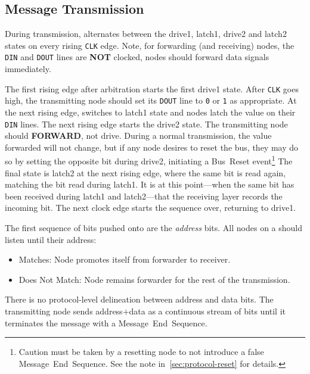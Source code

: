 \subsection{Message Transmission}
\label{sec:protocol-transmission}
During transmission, \bus alternates between the {\sc drive1}, {\sc latch1},
{\sc drive2} and {\sc latch2} states on every rising {\tt CLK} edge. 
Note, for forwarding (and receiving) nodes, the {\tt DIN} and {\tt DOUT} lines 
are {\bf NOT} clocked, nodes should forward data signals immediately.

The first rising edge after arbitration starts the first {\sc drive1} state.
After {\tt CLK} goes high, the transmitting node should set its {\tt DOUT}
line to {\tt 0} or {\tt 1} as appropriate. At the next rising edge, \bus
switches to {\sc latch1} state and nodes latch the value on their {\tt DIN}
lines. The next rising edge starts the {\sc drive2} state. The transmitting
node should \textsc{\textbf{FORWARD}}, not drive. During a normal
transmission, the value forwarded will not change, but if any node desires to
reset the bus, they may do so by setting the opposite bit during {\sc drive2},
initiating a Bus~Reset event\footnote{
  Caution must be taken by a resetting node to not introduce a false
  Message~End~Sequence. See the note in~\ref{sec:protocol-reset} for details.}
The final state is {\sc latch2} at the next rising edge, where the same bit is
read again, matching the bit read during {\sc latch1}.  It is at this
point---when the same bit has been received during {\sc latch1} and {\sc
latch2}---that the receiving layer records the incoming bit. The next clock
edge starts the sequence over, returning to {\sc drive1}.

The first sequence of bits pushed onto \bus are the {\em address} bits. All
nodes on a \bus should listen until their address:
\begin{itemize}
  \item Matches: Node promotes itself from forwarder to receiver.
  \item Does Not Match: Node remains forwarder for the rest of the
    transmission.
\end{itemize}

There is no protocol-level delineation between address and data bits. The
transmitting node sends address$+$data as a continuous stream of bits until
it terminates the message with a Message~End~Sequence.

